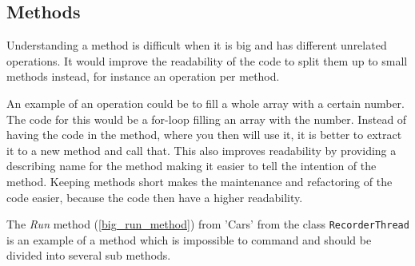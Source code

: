 \subsection{Methods}
Understanding a method is difficult when it is big and has different unrelated operations.
It would improve the readability of the code to split them up to small methods instead, for instance an operation per method.

An example of an operation could be to fill a whole array with a certain number.
The code for this would be a for-loop filling an array with the number.
Instead of having the code in the method, where you then will use it, it is better to extract it to a new method and call that.
This also improves readability by providing a describing name for the method making it easier to tell the intention of the method.
Keeping methods short makes the maintenance and refactoring of the code easier, because the code then have a higher readability.

The \textit{Run} method (\cref{big_run_method}) from 'Cars' from the class \lstinline!RecorderThread! is an example of a method which is impossible to command and should be divided into several sub methods.